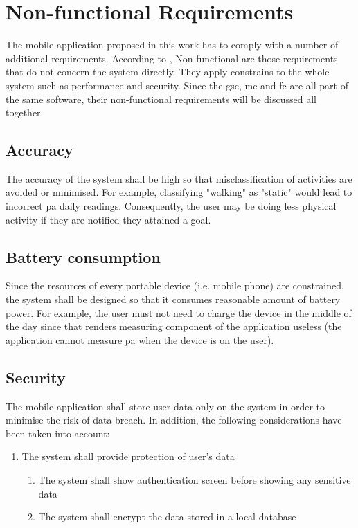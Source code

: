 \section{Non-functional Requirements}
The mobile application proposed in this work has to comply with a number of additional requirements. According to \citet[87]{sommerville2010}, Non-functional are those requirements that do not concern the system directly. They apply constrains to the whole system such as performance and security.  Since the \gls{gsc}, \gls{mc} and \gls{fc} are all part of the same software, their non-functional requirements will be discussed all together.
    
    
    \subsection{Accuracy}
    The accuracy of the system shall be high so that misclassification of activities are avoided or minimised. For example, classifying "walking" as "static" would lead to incorrect \gls{pa} daily readings. Consequently, the user may be doing less physical activity if they are notified they attained a goal.
    
    \subsection{Battery consumption}
    Since the resources of every portable device (i.e. mobile phone) are constrained, the system shall be designed so that it consumes reasonable amount of battery power. For example, the user must not need to charge the device in the middle of the day since that renders measuring component of the application useless (the application cannot measure \gls{pa} when the device is on the user).
    
    \subsection{Security}
    The mobile application shall store user data only on the system in order to minimise the risk of data breach. In addition, the following considerations have been taken into account:
    
    \begin{enumerate}
        \item The system shall provide protection of user's data
            \begin{enumerate}
                \item The system shall show authentication screen before showing any sensitive data
                \item The system shall encrypt the data stored in a local database
            \end{enumerate}
    \end{enumerate}
    
